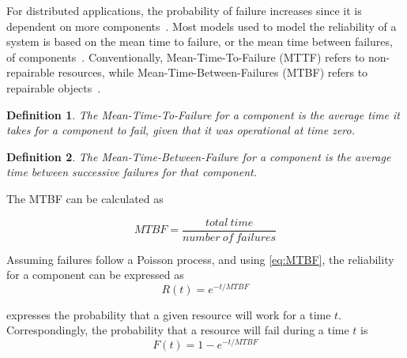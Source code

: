 \documentclass{cslthse-msc}
\newtheorem{definition}{Definition}[chapter]
\begin{document}
For distributed applications, the probability of failure increases since it is dependent on more components~\cite{relModelDistSimSystem}. Most models used to model the reliability of a system is based on the mean time to failure, or the mean time between failures, of components~\cite{relModelAnalysis}. Conventionally, Mean-Time-To-Failure (MTTF) refers to non-repairable resources, while Mean-Time-Between-Failures (MTBF) refers to repairable objects~\cite{effTaskReplMobGrid}.

\begin{definition} \label{def:mttf}
The Mean-Time-To-Failure for a component is the average time it takes for a component to fail, given that it was operational at time zero.
\end{definition}

\begin{definition} \label{def:MTBF}
The Mean-Time-Between-Failure for a component is the average time between successive failures for that component.
\end{definition}

The MTBF can be calculated as

\begin{equation} \label{eq:MTBF}
MTBF = \frac{total\ time}{number\ of\ failures}
\end{equation}

Assuming failures follow a Poisson process, and using \cref{eq:MTBF}, the reliability for a component can be expressed as 
\begin{equation} \label{eq:resource_reliability}
R(t) = e^{-t/MTBF}
\end{equation}

 expresses the probability that a given resource will work for a time $t$. Correspondingly, the probability that a resource will fail during a time $t$ is
\begin{equation} \label{eq:resource_failure_prob}
F(t) = 1- e^{-t/MTBF}
\end{equation}
\end{document}
